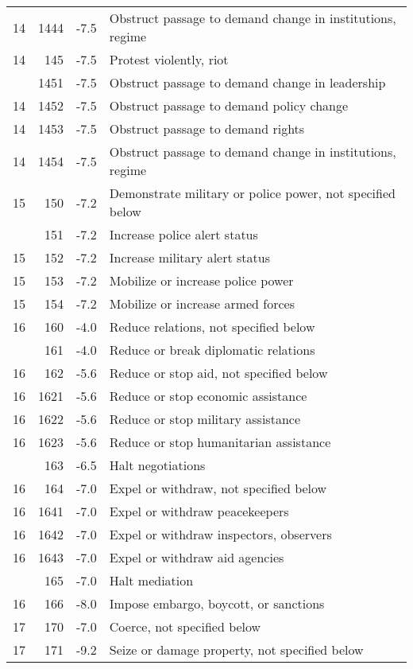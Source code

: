 \documentclass[10pt,]{article}
\begin{document}
\begin{longtable}[t]{rrrl}
14 & 1444 & -7.5 & Obstruct passage to demand change in institutions, regime\\
14 & 145 & -7.5 & Protest violently, riot\\
\addlinespace
14 & 1451 & -7.5 & Obstruct passage to demand change in  leadership\\
14 & 1452 & -7.5 & Obstruct passage to demand policy change\\
14 & 1453 & -7.5 & Obstruct passage to demand rights\\
14 & 1454 & -7.5 & Obstruct passage to demand change in institutions, regime\\
15 & 150 & -7.2 & Demonstrate military or police power, not specified below\\
\addlinespace
15 & 151 & -7.2 & Increase police alert status\\
15 & 152 & -7.2 & Increase military alert status\\
15 & 153 & -7.2 & Mobilize or increase police power\\
15 & 154 & -7.2 & Mobilize or increase armed forces\\
16 & 160 & -4.0 & Reduce relations, not specified below\\
\addlinespace
16 & 161 & -4.0 & Reduce or break diplomatic relations\\
16 & 162 & -5.6 & Reduce or stop aid, not specified below\\
16 & 1621 & -5.6 & Reduce or stop economic assistance\\
16 & 1622 & -5.6 & Reduce or stop military assistance\\
16 & 1623 & -5.6 & Reduce or stop humanitarian assistance\\
\addlinespace
16 & 163 & -6.5 & Halt negotiations\\
16 & 164 & -7.0 & Expel or withdraw, not specified below\\
16 & 1641 & -7.0 & Expel or withdraw peacekeepers\\
16 & 1642 & -7.0 & Expel or withdraw inspectors, observers\\
16 & 1643 & -7.0 & Expel or withdraw aid agencies\\
\addlinespace
16 & 165 & -7.0 & Halt mediation\\
16 & 166 & -8.0 & Impose embargo, boycott, or sanctions\\
17 & 170 & -7.0 & Coerce, not specified below\\
17 & 171 & -9.2 & Seize or damage property, not specified below\\

\end{longtable}
\end{document}
